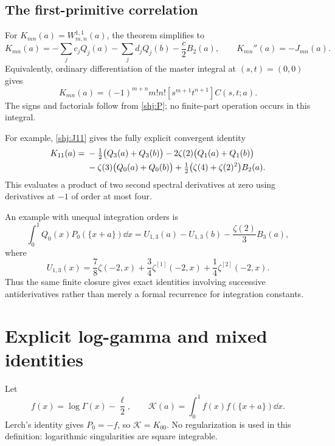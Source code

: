 \subsection{The first-primitive correlation}
For $K_{mn}(a)=W_{m,n}^{1,1}(a)$, the theorem simplifies to
\begin{equation}\label{shj:Klift}
K_{mn}(a)=-\sum_j c_jQ_j(a)-\sum_j d_jQ_j(b)-\frac c2B_2(a),
\qquad K_{mn}''(a)=-J_{mn}(a).
\end{equation}
Equivalently, ordinary differentiation of the master integral at $(s,t)=(0,0)$ gives
\begin{equation}\label{shj:KfromC}
K_{mn}(a)=(-1)^{m+n}m!n![s^{m+1}t^{n+1}]C(s,t;a).
\end{equation}
The signs and factorials follow from \eqref{shj:P}; no finite-part operation occurs in this integral.

For example, \eqref{shj:J11} gives the fully explicit convergent identity
\begin{align}
K_{11}(a)={}&-\tfrac12\big(Q_3(a)+Q_3(b)\big)
-2\zeta(2)\big(Q_1(a)+Q_1(b)\big)\notag\\
&-\zeta(3)\big(Q_0(a)+Q_0(b)\big)
+\tfrac12\big(\zeta(4)+\zeta(2)^2\big)B_2(a).
\label{shj:K11}
\end{align}
This evaluates a product of two second spectral derivatives at zero using derivatives at $-1$ of order at most four.

An example with unequal integration orders is
\begin{equation}\label{shj:W21}
\int_0^1Q_0(x)P_0(\{x+a\})\dd x
=U_{1,3}(a)-U_{1,3}(b)-\frac{\zeta(2)}3B_3(a),
\end{equation}
where
\[
U_{1,3}(x)=\frac78\zeta(-2,x)+\frac34\zeta^{[1]}(-2,x)
+\frac14\zeta^{[2]}(-2,x).
\]
Thus the same finite closure gives exact identities involving successive antiderivatives rather than merely a formal recurrence for integration constants.

\section{Explicit log-gamma and mixed identities}\label{shj:loggamma}
Let
\[
f(x)=\log\Gamma(x)-\frac\ell2,\qquad
\mathcal K(a)=\int_0^1 f(x)f(\{x+a\})\dd x.
\]
Lerch's identity gives $P_0=-f$, so $\mathcal K=K_{00}$. No regularization is used in this definition: logarithmic singularities are square integrable.

